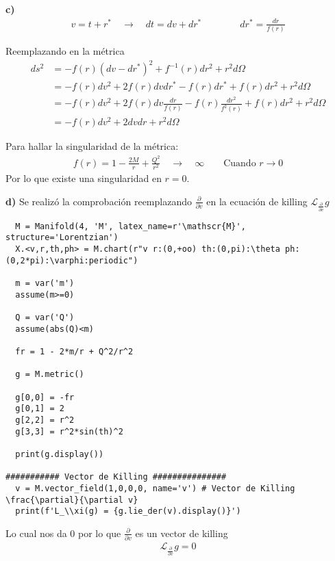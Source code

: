 \documentclass{article}
\begin{document}
\textbf{c) } 
\begin{gather*}
  v= t + r^* \quad \rightarrow \quad dt = dv + dr^* \qquad \qquad dr^* = \frac{dr }{f(r)} 
\end{gather*}

Reemplazando en la métrica 
\begin{align*}
  ds^2 &= - f(r) (dv-dr^*)^2 + f^{-1}\left(r\right) dr^2 + r^2 d\Omega \\
       &= - f(r) dv^2 + 2 f(r) dv dr^* - f(r) dr^* + f(r) dr^2 + r^2 d\Omega \\
       &= - f(r) dv^2 + 2 f(r) dv \frac{dr }{f(r) } - f(r) \frac{dr^2 }{f^2(r) } + f(r) dr^2 + r^2 d\Omega \\
       &= - f(r) dv^2 + 2 dvdr + r^2 d\Omega
\end{align*}

Para hallar la singularidad de la métrica: 
\begin{gather*}
  f(r) = 1 - \frac{2M }{r } + \frac{Q^2 }{r^2 } \quad \rightarrow \quad \infty \qquad \text{Cuando } r \rightarrow 0  
\end{gather*}
Por lo que existe una singularidad en $ r= 0 $.

\hfill


\hfill 

\textbf{d) } Se realizó la comprobación reemplazando $ \frac{\partial  }{\partial v } $ en la ecuación de killing $ \mathcal L _{\frac{\partial  }{\partial v }} g  $
\begin{verbatim}
  M = Manifold(4, 'M', latex_name=r'\mathscr{M}', structure='Lorentzian')
  X.<v,r,th,ph> = M.chart(r"v r:(0,+oo) th:(0,pi):\theta ph:(0,2*pi):\varphi:periodic")

  m = var('m')
  assume(m>=0)

  Q = var('Q')
  assume(abs(Q)<m)

  fr = 1 - 2*m/r + Q^2/r^2

  g = M.metric()

  g[0,0] = -fr
  g[0,1] = 2
  g[2,2] = r^2
  g[3,3] = r^2*sin(th)^2

  print(g.display())

########### Vector de Killing ###############
  v = M.vector_field(1,0,0,0, name='v') # Vector de Killing  \frac{\partial}{\partial v}
  print(f'L_\\xi(g) = {g.lie_der(v).display()}')
\end{verbatim}
Lo cual nos da 0 por lo que $ \frac{\partial  }{\partial v } $ es un vector de killing
\begin{gather*}
  \mathcal L _{\frac{\partial  }{\partial v }} g = 0 
\end{gather*}
\end{document}
